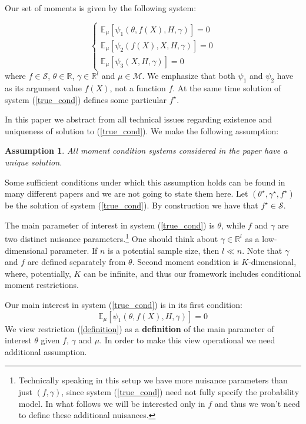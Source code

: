 \documentclass[12pt]{article}
\theoremstyle{plain}
\newtheorem{assumption}[theorem]{Assumption}
\begin{document}
Our set of moments is given by the following system:


\begin{equation}\label{true_cond}
\begin{cases}
\mathbb{E}_{\mu}[\psi_1(\theta, f(X), H,\gamma)] = 0\\
\mathbb{E}_{\mu}[\psi_2(f(X),X,H,\gamma)]=0\\
\mathbb{E}_{\mu}[\psi_3(X,H,\gamma)] = 0
\end{cases}
\end{equation}
where $f\in \mathcal{S}$, $\theta \in \mathbb{R}$, $\gamma \in \mathbb{R}^l$ and $\mu\in \mathcal{M}$. We emphasize that both $\psi_1$ and $\psi_2$ have as its argument value $f(X)$, not a function $f$. At the same time solution of system (\ref{true_cond}) defines some particular $f^{\star}$.

In this paper we abstract from all technical issues regarding existence and uniqueness of solution to (\ref{true_cond}). We make the following assumption:

\begin{assumption}\label{tech_uniq}
All moment condition systems considered in the paper have a unique solution. 
\end{assumption}

\noindent Some sufficient conditions under which this assumption holds can be found in many different papers and we are not going to state them here. Let $(\theta^{\star},\gamma^{\star},f^{\star})$ be the solution of system (\ref{true_cond}). By construction we have that $f^{\star}\in \mathcal{S}$.

The main parameter of interest in system (\ref{true_cond}) is $\theta$, while $f$ and $\gamma$ are two distinct nuisance parameters.\footnote{Technically speaking in this setup we have more nuisance parameters than just $(f,\gamma)$, since system (\ref{true_cond}) need not fully specify the probability model. In what follows we will be interested only in $f$ and thus we won't need to define these additional nuisances.}  One should think about $\gamma \in \mathbb{R}^l$ as a low-dimensional parameter. If $n$ is a potential sample size, then $l \ll n$. Note that $\gamma$ and $f$ are defined separately from $\theta$. Second moment condition is $K$-dimensional, where, potentially, $K$ can be infinite, and thus our framework includes conditional moment restrictions. 

Our main interest in system (\ref{true_cond}) is in its first condition:
\begin{equation}\label{definition}
\mathbb{E}_{\mu}[\psi_1(\theta, f(X), H,\gamma)] = 0
\end{equation}
We view restriction (\ref{definition}) as a \textbf{definition} of the main parameter of interest $\theta$ given $f$, $\gamma$ and $\mu$. In order to make this view operational we need additional assumption. 
\end{document}
